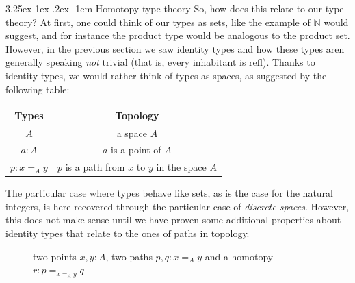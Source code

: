 \documentclass{report}
\makeatletter
\renewcommand\paragraph{\@startsection{paragraph}{5}{\z@}%
  {3.25ex \@plus1ex \@minus.2ex}%
  {-1em}%
  {\normalfont\normalsize\bfseries}}
\makeatother
\begin{document}
\paragraph{Homotopy type theory} So, how does this relate to our type theory? At first, one could think of our types as sets, like the example of $\mathbb N$ would suggest, and for instance the product type would be analogous to the product set. However, in the previous section we saw identity types and how these types aren generally speaking \textit{not} trivial (that is, every inhabitant is $\mathrm{refl}$).  Thanks to identity types, we would rather think of types as spaces, as suggested by the following table:
\begin{center}
\begin{tabular}{|c|c|}
\hline Types & Topology  \\
\hline$A$ & a space $A$   \\
\hline$a: A$ & $a$ is a point of $A$ \\
\hline $p : x=_A y$ & $p$ is a path from $x$ to $y$ in the space $A$ \\
\hline
\end{tabular}
\end{center}
The particular case where types behave like sets, as is the case for the natural integers, is here recovered through the particular case of \textit{discrete spaces}. However, this does not make sense until we have proven some additional properties about identity types that relate to the ones of paths in topology.
\begin{figure}[h]
  \centering
  \caption{two points $x,y : A$, two paths $p,q: x=_A y$ and a homotopy $r : p =_{x=_A y} q$}
\end{figure}
\end{document}
